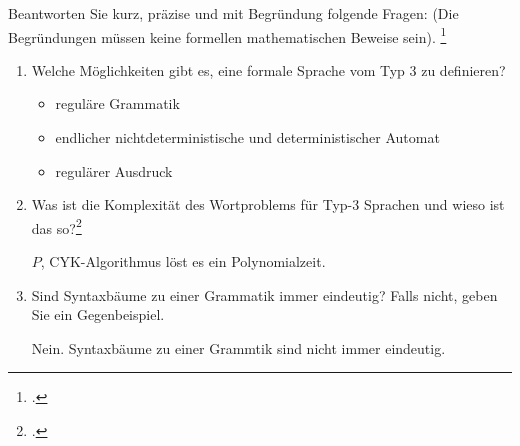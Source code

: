 \documentclass{bschlangaul-aufgabe}
\begin{document}


Beantworten Sie kurz, präzise und mit Begründung folgende Fragen: (Die
Begründungen müssen keine formellen mathematischen Beweise sein).
\footcite{examen:66115:2016:03}

\begin{enumerate}


\item Welche Möglichkeiten gibt es, eine formale Sprache vom Typ 3 zu
definieren?

\begin{bAntwort}
\begin{itemize}
\item reguläre Grammatik
\item endlicher nichtdeterministische und deterministischer Automat
\item regulärer Ausdruck
\end{itemize}
\end{bAntwort}



\item Was ist die Komplexität des Wortproblems für Typ-3 Sprachen und
wieso ist das so?\footcite[Aufgabe 5a)]{theo:ab:5}

\begin{bAntwort}
$P$, CYK-Algorithmus löst es ein Polynomialzeit.
\end{bAntwort}



\item Sind Syntaxbäume zu einer Grammatik immer eindeutig? Falls nicht,
geben Sie ein Gegenbeispiel.

\begin{bAntwort}
Nein. Syntaxbäume zu einer Grammtik sind nicht immer eindeutig.



\end{bAntwort}
\end{enumerate}
\end{document}
